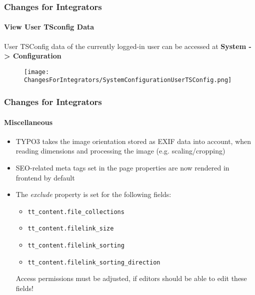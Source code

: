 
\begin{frame}[fragile]
	\frametitle{Changes for Integrators}
	\framesubtitle{View User TSconfig Data}

	User TSConfig data of the currently logged-in user can be accessed at
	\textbf{System -> Configuration}

	\begin{figure}
		\texttt{[image: ChangesForIntegrators/SystemConfigurationUserTSConfig.png]}
	\end{figure}

\end{frame}


\begin{frame}[fragile]
	\frametitle{Changes for Integrators}
	\framesubtitle{Miscellaneous}

	\begin{itemize}
		\item TYPO3 takes the image orientation stored as EXIF data into account,
			when reading dimensions and processing the image (e.g. scaling/cropping)
		\item SEO-related meta tags set in the page properties are now rendered
			in frontend by default
		\item The \textit{exclude} property is set for the following fields:

			\begin{itemize}
				\smaller
				\item \texttt{tt\_content.file\_collections}
				\item \texttt{tt\_content.filelink\_size}
				\item \texttt{tt\_content.filelink\_sorting}
				\item \texttt{tt\_content.filelink\_sorting\_direction}
			\end{itemize}

			\small
				Access permissions must be adjusted, if editors should be able
				to edit these fields!
			\normalsize

	\end{itemize}

\end{frame}

